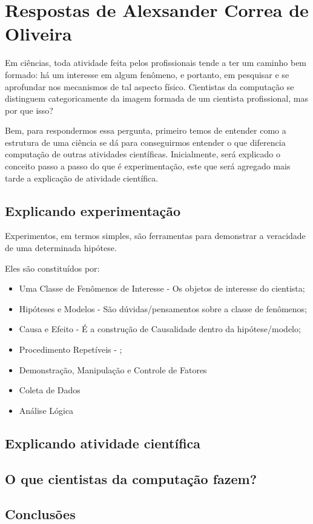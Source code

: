 \section{Respostas de Alexsander Correa de Oliveira}

Em ciências, toda atividade feita pelos profissionais tende a ter um caminho bem formado: há um interesse em algum fenômeno, e portanto, em pesquisar e se aprofundar nos mecanismos de tal aspecto físico. Cientistas da computação se distinguem categoricamente da imagem formada de um cientista profissional, mas por que isso?

Bem, para respondermos essa pergunta, primeiro temos de entender como a estrutura de uma ciência se dá para conseguirmos entender o que diferencia computação de outras atividades científicas. Inicialmente, será explicado o conceito passo a passo do que é experimentação, este que será agregado mais tarde a explicação de atividade científica.

\subsection{Explicando experimentação}

    Experimentos, em termos simples, são ferramentas para demonstrar a veracidade de uma determinada hipótese.
    
    Eles são constituídos por:
\begin{itemize}
    \item Uma Classe de Fenômenos de Interesse - Os objetos de interesse do cientista;
    \item Hipóteses e Modelos - São dúvidas/pensamentos sobre a classe de fenômenos;
    \item Causa e Efeito - É a construção de \gls{Causalidade} dentro da hipótese/modelo;
    \item Procedimento Repetíveis - ;
    \item Demonstração, Manipulação e Controle de Fatores
    \item Coleta de Dados
    \item Análise Lógica
\end{itemize}


\subsection{Explicando atividade científica}


\subsection{O que cientistas da computação fazem?}


\subsection{Conclusões}